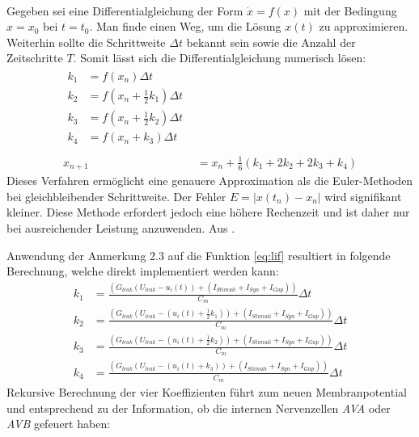 	\begin{remark}\\
		Gegeben sei eine Differentialgleichung der Form $\dot{x} = f(x)$ mit der Bedingung $x = x_0$ bei $t = t_0$. Man finde einen Weg, um die Lösung $x(t)$ zu approximieren.\\
		Weiterhin sollte die Schrittweite $\Delta t$ bekannt sein sowie die Anzahl der Zeitschritte $T$. Somit lässt sich die Differentialgleichung numerisch lösen:
		\begin{align}
			\begin{split}
			\label{eq:runkgekutta}
			k_1 &= f(x_n) \Delta t\\
			k_2 &= f(x_n + \tfrac{1}{2} k_1) \Delta t\\
			k_3 &= f(x_n + \tfrac{1}{2} k_2) \Delta t\\
			k_4 &= f(x_n + k_3) \Delta t\\
			\end{split}\\[10pt]
			x_{n+1} &= x_n + \tfrac{1}{6} (k_1 + 2 k_2 + 2 k_3 + k_4)
		\end{align}
		Dieses Verfahren ermöglicht eine genauere Approximation als die Euler-Methoden bei gleichbleibender Schrittweite. Der Fehler $E = |x(t_n)-x_n|$ wird signifikant kleiner. Diese Methode erfordert jedoch eine höhere Rechenzeit und ist daher nur bei ausreichender Leistung anzuwenden. Aus \cite{NonlinearDynamics}.
	\end{remark}
	Anwendung der Anmerkung 2.3 auf die Funktion \ref{eq:lif} resultiert in folgende Berechnung, welche direkt implementiert werden kann:
	\begin{equation}
	\begin{split}
		\label{eq:runkgekutta_nn}
		k_1 &= \frac{(G_{leak} (U_{leak} - u_i(t)) + (I_{Stimuli} + I_{Syn} + I_{Gap}))}{C_m} \Delta t\\
		k_2 &= \frac{(G_{leak} (U_{leak} - (u_i(t) + \tfrac{1}{2} k_1)) + (I_{Stimuli} + I_{Syn} + I_{Gap}))}{C_m} \Delta t\\
		k_3 &= \frac{(G_{leak} (U_{leak} - (u_i(t) + \tfrac{1}{2} k_2)) + (I_{Stimuli} + I_{Syn} + I_{Gap}))}{C_m} \Delta t\\
		k_4 &= \frac{(G_{leak} (U_{leak} - (u_i(t) + k_3)) + (I_{Stimuli} + I_{Syn} + I_{Gap}))}{C_m} \Delta t
	\end{split}
	\end{equation}
	Rekursive Berechnung der vier Koeffizienten führt zum neuen Membranpotential und entsprechend zu der Information, ob die internen Nervenzellen \textit{AVA} oder \textit{AVB} gefeuert haben:
